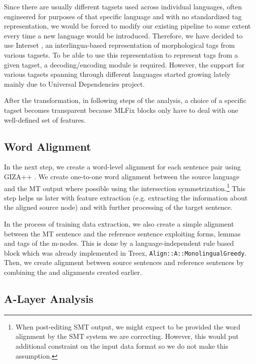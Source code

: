 Since there are usually different tagsets used across individual languages,
often engineered for purposes of that specific language and with no standardized
tag representation,
we would be forced to modify our existing pipeline to some extent every time
a new language would be introduced.
Therefore, we have decided to use Interset \citep{biblio:ZeReusableTagset2008}, an interlingua-based
representation of morphological tags from various tagsets. To be able to use this
representation to represent tags from a given tagset, a decoding/encoding
module is required. However, the support for various tagsets spanning
through different languages started growing lately mainly due to Universal Dependencies \citep{universal-dep:2016} project.

After the transformation, in following steps of the analysis, a choice
of a specific tagset becomes transparent because MLFix blocks only
have to deal with one well-defined set of features.

\subsection{Word Alignment}

In the next step, we create a word-level alignment for each sentence pair
using GIZA++ \citep{och:ney:2000}. We create one-to-one word alignment between the source language
and the MT output where possible
using the intersection symmetrization.\footnote{When post-editing SMT output, we might expect to be provided
the word alignment by the SMT system we are correcting. However, this would put additional constraint
on the input data format so we do not make this assumption.} This step helps us later with feature extraction (e.g. extracting the information about the aligned source node)
and with further processing of the target sentence.

In the process of training data extraction, we also create a simple alignment between
the MT sentence and the reference sentence exploiting forms, lemmas and tags
of the m-nodes. This is done by a language-independent rule based block which was already implemented
in Treex, \texttt{Align::A::MonolingualGreedy}.
Then, we create alignment between source sentences and reference sentences by combining
the  and  alignments created earlier.

\subsection{A-Layer Analysis}

